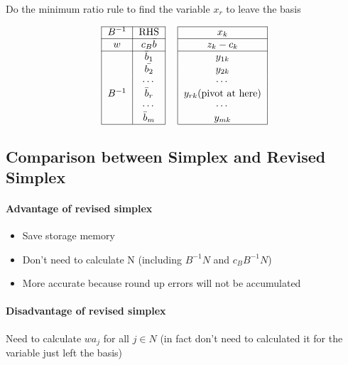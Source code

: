             Do the minimum ratio rule to find the variable $x_r$ to leave the basis

            \begin{align}
                \begin{tabular}{|c|c|c|c|}  
                    \cline{1-2} \cline{4-4} $B^{-1}$ & RHS & & $x_k$ \\
                    \cline{1-2} \cline{4-4} $w$ & $c_B\bar{b}$ & & $z_k-c_k$ \\
                    \cline{1-2} \cline{4-4} & $\bar{b}_1$ & & $y_{1k}$\\
                    & $\bar{b_2}$ & & $y_{2k}$\\
                    & $\cdots$ & & $\cdots$\\
                    $B^{-1}$ & $\bar{b}_r$ & & $y_{rk}$(pivot at here)\\
                    & $\cdots$ & & $\cdots$\\
                    & $\bar{b}_m$ & & $y_{mk}$\\
                    \cline{1-2} \cline{4-4} 
                \end{tabular} \nonumber
            \end{align}

        \subsection{Comparison between Simplex and Revised Simplex}
            \paragraph{Advantage of revised simplex}
                \begin{itemize}
                    \item Save storage memory
                    \item Don\rq{}t need to calculate N (including $B^{-1}N$ and $c_BB^{-1}N$)
                    \item More accurate because round up errors will not be accumulated 
                \end{itemize}

            \paragraph{Disadvantage of revised simplex}
                Need to calculate $wa_j$ for all $j \in N$ (in fact don\rq{}t need to calculated it for the variable just left the basis) 

